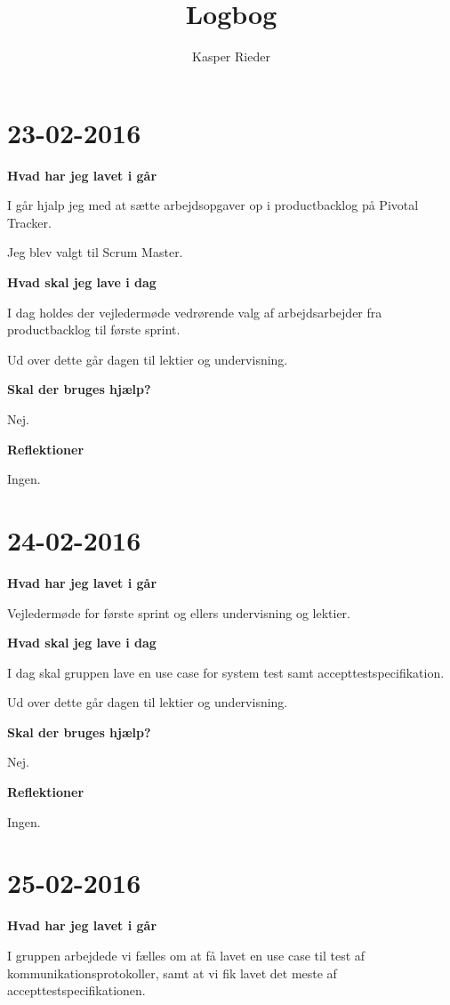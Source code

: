 \documentclass{article}
\title{Logbog}
\author{Kasper Rieder}
\date{}
\begin{document}
	\maketitle
	\tableofcontents
	\newpage
	
	\section{23-02-2016}
	
	\textbf{Hvad har jeg lavet i går}
	
	I går hjalp jeg med at sætte arbejdsopgaver op i productbacklog på Pivotal Tracker.
	
	Jeg blev valgt til Scrum Master.
	
	\textbf{Hvad skal jeg lave i dag}
	
	I dag holdes der vejledermøde vedrørende valg af arbejdsarbejder fra productbacklog til første sprint.
	
	Ud over dette går dagen til lektier og undervisning.
	
	\textbf{Skal der bruges hjælp?}
	
	Nej.
	
	\textbf{Reflektioner}
	
	Ingen.
	
	\section{24-02-2016}
	
	\textbf{Hvad har jeg lavet i går}
	
	Vejledermøde for første sprint og ellers undervisning og lektier.
	
	\textbf{Hvad skal jeg lave i dag}
	
	I dag skal gruppen lave en use case for system test samt accepttestspecifikation.
	
	Ud over dette går dagen til lektier og undervisning.
	
	\textbf{Skal der bruges hjælp?}
	
	Nej.
	
	\textbf{Reflektioner}
	
	Ingen.
	
	\section{25-02-2016}
	
	\textbf{Hvad har jeg lavet i går}
	
	I gruppen arbejdede vi fælles om at få lavet en use case til test af kommunikationsprotokoller, samt at vi fik lavet det meste af accepttestspecifikationen.
	
\end{document}
